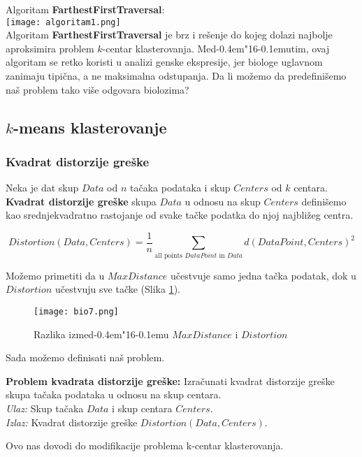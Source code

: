 \documentclass[a4paper]{book}
\def \dj {d\kern-0.4em\char"16\kern-0.1em}
\begin{document}
Algoritam \textbf{FarthestFirstTraversal}:
\\
\texttt{[image: algoritam1.png]}
\\

Algoritam \textbf{FarthestFirstTraversal} je brz i rešenje do kojeg dolazi najbolje aproksimira problem $k$-centar klasterovanja. Me\dj utim, ovaj algoritam se retko koristi u analizi genske ekspresije, jer biologe uglavnom zanimaju tipična, a ne maksimalna odstupanja. Da li možemo da predefinišemo naš problem tako više odgovara biolozima?


\subsection{$k$-means klasterovanje}

\subsubsection{Kvadrat distorzije greške}

Neka je dat skup $Data$ od $n$ tačaka podataka i skup $Centers$ od $k$ centara.  \textbf{Kvadrat distorzije greške} skupa $Data$ u odnosu na skup $Centers$ definišemo kao srednjekvadratno rastojanje od svake tačke podatka do njoj najbližeg centra. 

$$Distortion(Data, Centers) = \frac{1}{n} \sum_{\text{all points }DataPoint\text{ in }Data} d(DataPoint, Centers)^2$$

Možemo primetiti da u $MaxDistance$ učestvuje samo jedna tačka podatak, dok u $Distortion$ učestvuju sve tačke (Slika \ref{slika 8}).
\begin{figure}[h]
    \centering
    \texttt{[image: bio7.png]}
    \caption{Razlika izme\dj u $MaxDistance$ i $Distortion$}
    \label{slika 8}
\end{figure}

Sada možemo definisati naš problem.

\begin{tcolorbox}
\textbf{Problem kvadrata distorzije greške:} Izračunati kvadrat distorzije greške skupa tačaka podataka u odnosu na skup centara.\\
\textit{Ulaz:} Skup tačaka $Data$ i skup centara $Centers$.\\
\textit{Izlaz:} Kvadrat distorzije greške $Distortion(Data, Centers)$.
\end{tcolorbox}

Ovo nas dovodi do modifikacije problema k-centar klasterovanja.
\end{document}
